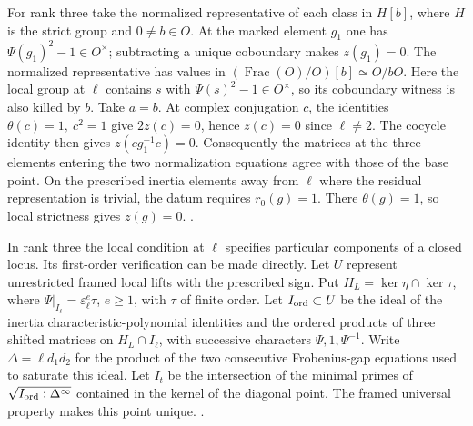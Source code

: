 For rank three take the normalized representative of each class in
\(H[b]\), where \(H\) is the strict group and \(0\ne b\in O\). At the
marked element \(g_1\) one has \(\Psi(g_1)^2-1\in O^\times\);
subtracting a unique coboundary makes \(z(g_1)=0\). The normalized
representative has values in \((\operatorname{Frac}(O)/O)[b]\simeq O/bO\).
Here the local group at \(\ell\) contains \(s\) with
\(\Psi(s)^2-1\in O^\times\), so its coboundary witness is also killed
by \(b\). Take \(a=b\). At complex conjugation \(c\), the identities
\(\theta(c)=1,\ c^2=1\) give \(2z(c)=0\), hence \(z(c)=0\) since
\(\ell\ne2\). The cocycle identity then gives \(z(cg_1^{-1}c)=0\).
Consequently the matrices at the three elements entering the two
normalization equations agree with those of the base point.
On the prescribed inertia elements away from \(\ell\) where the
residual representation is trivial, the datum requires \(r_0(g)=1\).
There \(\theta(g)=1\), so local strictness gives \(z(g)=0\).
.

In rank three the local condition at \(\ell\) specifies particular
components of a closed locus. Its first-order verification can be made
directly. Let \(U\) represent unrestricted framed local lifts with the
prescribed sign. Put \(H_L=\ker\eta\cap\ker\tau\), where
\(\Psi|_{I_\ell}=\varepsilon_\ell^e\tau\), \(e\ge1\), with \(\tau\)
of finite order. Let \(I_{\rm ord}\subset U\) be the ideal of the
inertia characteristic-polynomial identities and the ordered products
of three shifted matrices on \(H_L\cap I_\ell\), with successive
characters \(\Psi,1,\Psi^{-1}\). Write \(\Delta=\ell d_1d_2\) for the
product of the two consecutive Frobenius-gap equations used to saturate
this ideal. Let \(I_t\) be the intersection of the minimal primes of
\(\sqrt{I_{\rm ord}:\Delta^\infty}\) contained in the kernel of the
diagonal point. The framed universal property makes this point unique.
.

